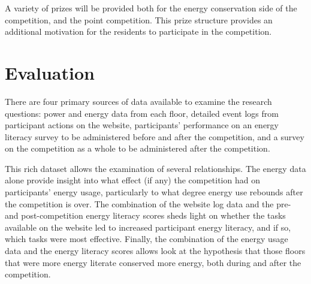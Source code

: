 \documentclass{chi-ext}
\begin{document}
\begin{multicols}{2}
A variety of prizes will be provided both for the energy conservation side of the competition, and the point competition. This prize structure provides an additional motivation for the residents to participate in the competition.

\section{Evaluation}

%

There are four primary sources of data available to examine the research questions: power and energy data from each floor, detailed event logs from participant actions on the website, participants' performance on an energy literacy survey to be administered before and after the competition, and a survey on the competition as a whole to be administered after the competition.

This rich dataset allows the examination of several relationships. The energy data alone provide insight into what effect (if any) the competition had on participants' energy usage, particularly to what degree energy use rebounds after the competition is over. The combination of the website log data and the pre- and post-competition energy literacy scores sheds light on whether the tasks available on the website led to increased participant energy literacy, and if so, which tasks were most effective. Finally, the combination of the energy usage data and the energy literacy scores allows look at the hypothesis that those floors that were more energy literate conserved more energy, both during and after the competition.


\end{multicols}
\end{document}
